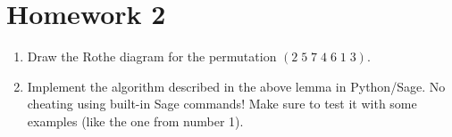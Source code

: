 \bigskip

\section*{\bf Homework 2}



\begin{enumerate}
    \item Draw the Rothe diagram for the permutation $(2\; 5\; 7\; 4\; 6\; 1\; 3)$.
    \item Implement the algorithm described in the above lemma in Python/Sage. No cheating using built-in Sage commands!
    Make sure to test it with some examples (like the one from number 1).
\end{enumerate}

